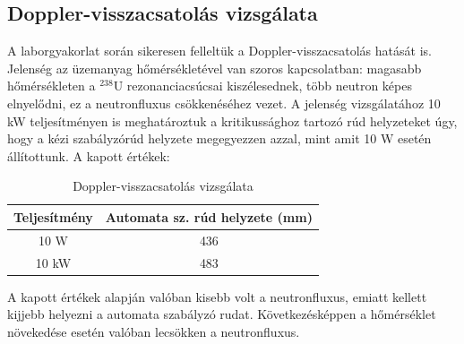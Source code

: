 \documentclass[12pt,a4paper]{article}
\begin{document}
\subsection{Doppler-visszacsatolás vizsgálata}
\hspace*{10pt} A laborgyakorlat során sikeresen felleltük a Doppler-visszacsatolás hatását is. Jelenség az üzemanyag hőmérsékletével van szoros kapcsolatban: magasabb hőmérsékleten a $^{238}$U rezonanciacsúcsai kiszélesednek, több neutron képes elnyelődni, ez a neutronfluxus csökkenéséhez vezet. A jelenség vizsgálatához 10 kW teljesítményen is meghatároztuk a kritikussághoz tartozó rúd helyzeteket úgy, hogy a kézi szabályzórúd helyzete megegyezzen azzal, mint amit 10 W esetén állítottunk. A kapott értékek:
\begin{table}[!h]
\begin{center}
\begin{tabular}{|c|c|}
\hline
Teljesítmény & Automata sz. rúd helyzete (mm)\\
\hline
10 W & 436 \\
\hline
10 kW & 483 \\
\hline
\end{tabular}
\caption{Doppler-visszacsatolás vizsgálata}
\end{center}
\end{table}
\newline
A kapott értékek alapján valóban kisebb volt a neutronfluxus, emiatt kellett kijjebb helyezni a automata szabályzó rudat. Következésképpen a hőmérséklet növekedése esetén valóban lecsökken a neutronfluxus.\\
\newpage
\end{document}
